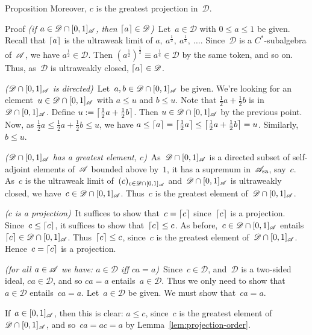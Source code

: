 \documentclass[a]{subfiles}
\begin{document}
\begin{parsec}
\begin{point}{Proposition}
Moreover, $c$ is the greatest projection in~$\mathscr{D}$.
\begin{point}{Proof}%
\emph{(if $a\in \mathscr{D}\cap [0,1]_{\mathscr{A}}$, 
then $\left\lceil a\right\rceil\in\mathscr{D}$)}\ 
Let~$a\in\mathscr{D}$ with $0\leq a \leq 1$
be given.
Recall that $\left\lceil a\right\rceil$
is the ultraweak limit of $a,\ a^{\frac{1}{2}},\ a^{\frac{1}{4}},\ \dotsc$.
Since~$\mathscr{D}$ is a $C^*$-subalgebra of~$\mathscr{A}$,
we have $a^{\frac{1}{2}}\in \mathscr{D}$.
Then $(a^{\frac{1}{2}})^{\frac{1}{2}} \equiv a^{\frac{1}{4}}\in \mathscr{D}$
by the same token,
and so on.
Thus, as~$\mathscr{D}$ is ultraweakly closed, $\left\lceil a\right\rceil\in\mathscr{D}$.

\emph{($\mathscr{D}\cap [0,1]_{\mathscr{A}}$ is directed)}\ 
Let~$a,b\in \mathscr{D}\cap[0,1]_{\mathscr{A}}$ be given.
We're looking for an element~$u\in \mathscr{D}\cap[0,1]_{\mathscr{A}}$
with $a\leq u$ and $b\leq u$.
Note that $\frac{1}{2}a + \frac{1}{2}b$
is in~$\mathscr{D}\cap[0,1]_{\mathscr{A}}$.
Define
$u:=\left\lceil\frac{1}{2}a+\frac{1}{2}b\right\rceil$.
Then  $u\in \mathscr{D}\cap[0,1]_{\mathscr{A}}$
by the previous point.
Now, 
as $\frac{1}{2}a \leq \frac{1}{2}a+\frac{1}{2}b \leq u$,
we have $a \leq \left\lceil a\right\rceil =\left\lceil\frac{1}{2}a\right\rceil \leq 
\left\lceil \frac{1}{2}a+\frac{1}{2}b\right\rceil = u$.
Similarly, $b\leq u$.


\emph{($\mathscr{D}\cap [0,1]_{\mathscr{A}}$
has a greatest element, $c$)}\ 
As~$\mathscr{D}\cap[0,1]_{\mathscr{A}}$
is a directed subset of self-adjoint elements 
of~$\mathscr{A}$ bounded above by~$1$,
it has a supremum in~$\mathscr{A}_\mathrm{sa}$,
say~$c$.
As~$c$ is the ultraweak limit of~$(c)_{c\in \mathscr{D}\cap[0,1]_{\mathscr{A}}}$
and~$\mathscr{D}\cap[0,1]_{\mathscr{A}}$ is ultraweakly closed,
we have~$c\in \mathscr{D}\cap[0,1]_{\mathscr{A}}$.
Thus~$c$ is the greatest element of~$\mathscr{D}\cap[0,1]_{\mathscr{A}}$.

\emph{($c$ is a projection)}\ 
It suffices to show that~$c=\left\lceil c\right\rceil$ since~$\left\lceil c\right\rceil$ is a projection.
Since~$c\leq \left\lceil c\right\rceil$, it suffices to show that~$\left\lceil c\right\rceil\leq c$.
As before,~$c\in \mathscr{D}\cap[0,1]_{\mathscr{A}}$
entails~$\left\lceil c\right\rceil\in\mathscr{D}\cap[0,1]_{\mathscr{A}}$.
Thus~$\left\lceil c\right\rceil\leq c$, since~$c$ is the
greatest element of~$\mathscr{D}\cap[0,1]_{\mathscr{A}}$.
Hence~$c=\left\lceil c\right\rceil$ is a projection.

\emph{(for all $a\in \mathscr{A}$
we have: $a\in \mathscr{D}$ iff $ca=a$)}\ 
Since~$c\in \mathscr{D}$,
and~$\mathscr{D}$ is a two-sided ideal,
$ca\in \mathscr{D}$, and so $ca=a$ entails~$a\in\mathscr{D}$.
Thus we only need to show that~$a\in\mathscr{D}$
entails~$ca=a$.
Let~$a\in\mathscr{D}$
be given.
We must show that~$ca=a$.

If~$a\in [0,1]_{\mathscr{A}}$,
then this is clear:
$a\leq c$, since~$c$ is the greatest element
of~$\mathscr{D}\cap [0,1]_{\mathscr{A}}$,
and so~$ca=ac=a$ by Lemma~\ref{lem:projection-order}.


\end{point}
\end{point}
\end{parsec}
\end{document}
